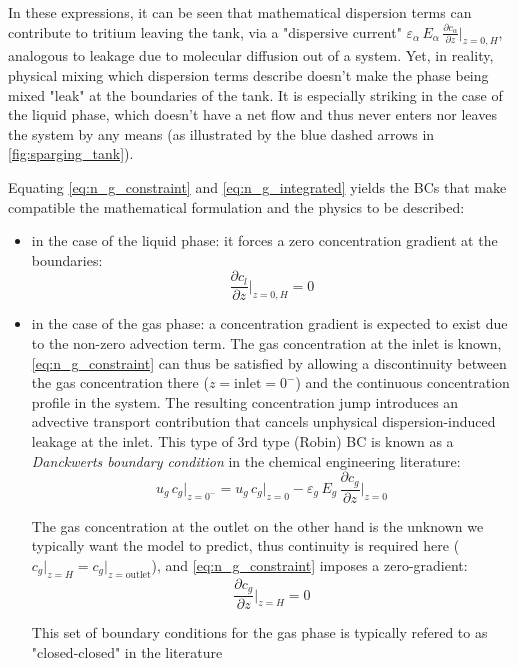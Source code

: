 \documentclass[a4paper,11pt,oneside]{report}
\begin{document}
In these expressions, it can be seen that mathematical dispersion terms can contribute to tritium leaving the tank, via a "dispersive current" $\varepsilon_\alpha\,E_\alpha\,\frac{\partial c_\alpha}{\partial z}\bigg\rvert_{z=0,H}$, analogous to leakage due to molecular diffusion out of a system. Yet, in reality, physical mixing which dispersion terms describe doesn't make the phase being mixed "leak" at the boundaries of the tank. It is especially striking in the case of the liquid phase, which doesn't have a net flow and thus never enters nor leaves the system by any means (as illustrated by the blue dashed arrows in \cref{fig:sparging_tank}). 

Equating \cref{eq:n_g_constraint} and \cref{eq:n_g_integrated} yields the BCs that make compatible the mathematical formulation and the physics to be described: 
\begin{itemize}
    \item in the case of the liquid phase: it forces a zero concentration gradient at the boundaries: 
        \begin{equation*}
            \frac{\partial c_l}{\partial z}\bigg \rvert_{z=0,H}=0
        \end{equation*}
    
    \item in the case of the gas phase: a concentration gradient is expected to exist due to the non-zero advection term. The gas concentration at the inlet is known, \cref{eq:n_g_constraint} can thus be satisfied by allowing a discontinuity between the gas concentration there ($z=\mathrm{inlet}=0^-$) and the continuous concentration profile in the system. The resulting concentration jump introduces an advective transport contribution that cancels unphysical dispersion-induced leakage at the inlet. This type of 3rd type (Robin) BC is known as a \textit{Danckwerts boundary condition} in the chemical engineering literature: 
        \begin{equation*}
            u_g\,c_g\rvert_{z=0^-}= u_g\,c_g\rvert_{z=0} -\varepsilon_g\,E_g\,\frac{\partial c_g}{\partial z}\bigg\rvert_{z=0}
        \end{equation*}
    
    The gas concentration at the outlet on the other hand is the unknown we typically want the model to predict, thus continuity is required here ($c_g\rvert_{z=H}=c_g\rvert_{z=\mathrm{outlet}}$), and \cref{eq:n_g_constraint} imposes a zero-gradient: 
        \begin{equation*}
            \frac{\partial c_g}{\partial z}\bigg \rvert_{z=H}=0
        \end{equation*}
    
    This set of boundary conditions for the gas phase is typically refered to as "closed-closed" in the literature\cite{levenspiel_chemical_1999,mohan_experimental_2010}
\end{itemize} 
\end{document}
